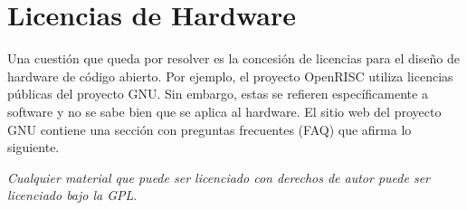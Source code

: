 
\section{Licencias de Hardware}

Una cuestión que queda por resolver es la concesión de licencias
para el diseño de hardware de código abierto. Por ejemplo, el proyecto
OpenRISC utiliza licencias públicas del proyecto GNU. Sin embargo,
estas se refieren específicamente a software y no se sabe bien que se
aplica al hardware. El sitio web del proyecto GNU contiene una sección
con preguntas frecuentes (FAQ) que afirma lo siguiente.

\textit{Cualquier material que puede ser licenciado con derechos de
autor puede ser licenciado bajo la GPL}.




